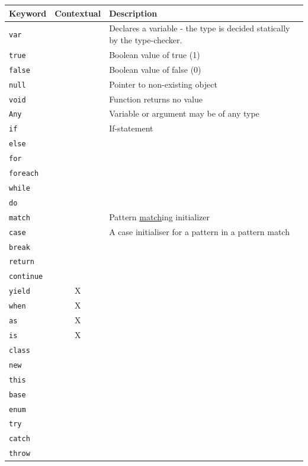 \documentclass{article}
\begin{document}
\begin{table}[H]
	\centering
	\label{sec:Keywords}
	\begin{tabular}{|l|c|p{}|}
	\hline
	Keyword & Contextual & Description \\ \hline
	\texttt{var} & & Declares a variable - the type is decided statically by the type-checker. \\ \hline
	\texttt{true} & & Boolean value of true (1) \\ \hline
	\texttt{false} & & Boolean value of false (0) \\ \hline
	\texttt{null} & & Pointer to non-existing object \\ \hline
	\texttt{void} & & Function returns no value  \\ \hline
	\texttt{Any} & & Variable or argument may be of any type \\ \hline
	\texttt{if} & & If-statement \\ \hline
	\texttt{else} & & \\ \hline
	\texttt{for} & & \\ \hline
	\texttt{foreach} & & \\ \hline
	\texttt{while} & & \\ \hline
	\texttt{do} & & \\ \hline
	\texttt{match} & & Pattern \underline{match}ing initializer \\ \hline
	\texttt{case} & & A case initialiser for a pattern in a pattern match \\ \hline
	\texttt{break} & & \\ \hline
	\texttt{return} & &  \\ \hline
	\texttt{continue} & & \\ \hline
	\texttt{yield} & X & \\ \hline
	\texttt{when} & X & \\ \hline
	\texttt{as} & X & \\ \hline
	\texttt{is} & X & \\ \hline
	\texttt{class} & & \\ \hline
	\texttt{new} & & \\ \hline
	\texttt{this} & & \\ \hline
	\texttt{base} & & \\ \hline
	\texttt{enum} & & \\ \hline
	\texttt{try} & & \\ \hline
	\texttt{catch} & & \\ \hline
	\texttt{throw} & & \\ \hline

\end{tabular}
\end{table}
\end{document}
